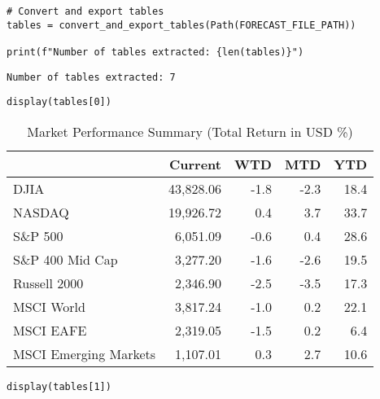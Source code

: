 \begin{verbatim}
# Convert and export tables
tables = convert_and_export_tables(Path(FORECAST_FILE_PATH))

print(f"Number of tables extracted: {len(tables)}")
\end{verbatim}




\begin{verbatim}
Number of tables extracted: 7
\end{verbatim}




\begin{verbatim}
display(tables[0])
\end{verbatim}

\begin{table}[htbp]
\centering
\begin{tabular}{lrrrr}
\hline
 & Current & WTD & MTD & YTD \\
\hline
DJIA & 43,828.06 & -1.8 & -2.3 & 18.4 \\
NASDAQ & 19,926.72 & 0.4 & 3.7 & 33.7 \\
S\&P 500 & 6,051.09 & -0.6 & 0.4 & 28.6 \\
S\&P 400 Mid Cap & 3,277.20 & -1.6 & -2.6 & 19.5 \\
Russell 2000 & 2,346.90 & -2.5 & -3.5 & 17.3 \\
MSCI World & 3,817.24 & -1.0 & 0.2 & 22.1 \\
MSCI EAFE & 2,319.05 & -1.5 & 0.2 & 6.4 \\
MSCI Emerging Markets & 1,107.01 & 0.3 & 2.7 & 10.6 \\
\hline
\end{tabular}
\caption{Market Performance Summary (Total Return in USD \%)}
\label{tab:market-performance}
\end{table}


\begin{verbatim}
display(tables[1])
\end{verbatim}

